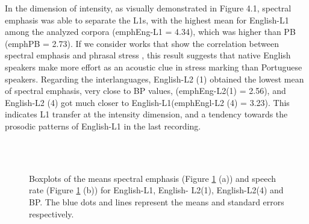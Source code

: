 In the dimension of intensity, as visually demonstrated in Figure 4.1, spectral
emphasis was able to separate the L1s, with the highest mean for English-L1
among the analyzed corpora (emphEng-L1 = 4.34), which was higher than PB
(emphPB = 2.73). If we consider works that show the correlation between
spectral emphasis and phrasal stress \citep{heldner2001}, %
this result suggests that
native English speakers make more effort as an acoustic clue in stress marking
than Portuguese speakers. Regarding the interlanguages, English-L2 (1) obtained
the lowest mean of spectral emphasis, very close to BP values, (emphEng-L2(1) =
2.56), and English-L2 (4) got much closer to English-L1(emphEngl-L2 (4) =
3.23). This indicates L1 transfer at the intensity dimension, and a tendency
towards the prosodic patterns of English-L1 in the last recording.

\begin{figure}
\centering
{}\\
\\
\caption{Boxplots of the means spectral emphasis (Figure \ref{leo-fig04} (a)) and speech rate
(Figure \ref{leo-fig04} (b)) for English-L1, English- L2(1), English-L2(4) and BP. The blue
dots and lines represent the means and standard errors respectively.}
\label{leo-fig04}
\end{figure}

